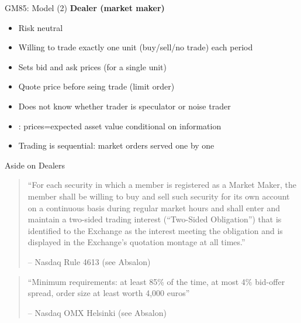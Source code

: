 \documentclass[english,10pt
,aspectratio=169
]{beamer}
\begin{document}
\begin{frame}{GM85: Model (2)}
	\textbf{Dealer (market maker)}
	\begin{itemize}
		\item Risk neutral
		\item Willing to trade \alert{exactly one unit} (buy/sell/no trade) each period
		\item Sets \alert{bid and ask prices} (for a single unit)
		\item Quote price before seing trade (limit order)
		\item Does not know whether trader is speculator or noise trader
		\item {}: prices=expected asset value conditional on information
		\item Trading is sequential: market orders served one by one
	\end{itemize}
\end{frame}


\begin{frame}{Aside on Dealers}
	\begin{quotation}
		\small ``For each security in which a member is registered as a Market Maker, the member shall be willing to buy and sell such security for its own account on a continuous basis during regular market hours and shall enter and maintain a two-sided trading interest (``Two-Sided Obligation'') that is identified to the Exchange as the interest meeting the obligation and is displayed in the Exchange's quotation montage at all times.''
		\begin{flushright}
			-- Nasdaq Rule 4613 (see Absalon)
		\end{flushright}
	\end{quotation}
	\vspace{3ex}
	\begin{quotation}
		\small ``Minimum requirements: at least 85\% of the time, at most 4\% bid-offer
		spread, order size at least worth 4,000 euros''
		\begin{flushright}
			-- Nasdaq OMX Helsinki (see Absalon)
		\end{flushright}
	\end{quotation}
\end{frame}
\end{document}
